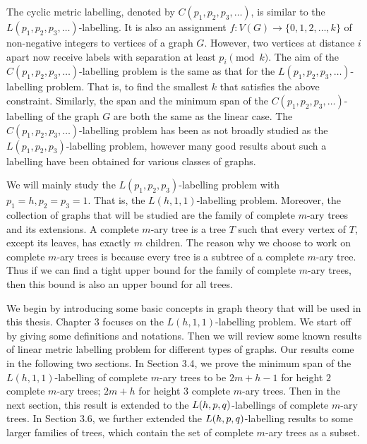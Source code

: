 The cyclic metric labelling, denoted by $C(p_1, p_2, p_3, \dots)$, is similar to the $L(p_1, p_2, p_3, \dots)$-labelling. It is also an assignment $f: V(G) \rightarrow \{0, 1, 2, \dots, k\}$ of non-negative integers to vertices of a graph $G$. However, two vertices at distance $i$ apart now receive labels with separation at least $p_i \pmod{k}$. The aim of the $C(p_1, p_2, p_3, \dots)$-labelling problem is the same as that for the $L(p_1, p_2, p_3, \dots)$-labelling problem. That is, to find the smallest $k$ that satisfies the above constraint. Similarly, the span and the minimum span of the $C(p_1, p_2, p_3, \dots)$-labelling of the graph $G$ are both the same as the linear case. The $C(p_1, p_2, p_3, \dots)$-labelling problem has been as not broadly studied as the $L(p_1, p_2, p_3)$-labelling problem, however many good results about such a labelling have been obtained for various classes of graphs.  

We will mainly study the $L(p_1, p_2, p_3)$-labelling problem with $p_1 = h, p_2=p_3=1$. That is, the $L(h,1,1)$-labelling problem. Moreover, the collection of graphs that will be studied are the family of complete $m$-ary trees and its extensions. A complete $m$-ary tree is a tree $T$ such that every vertex of $T$, except its leaves, has exactly $m$ children. The reason why we choose to work on complete $m$-ary trees is because every tree is a subtree of a complete $m$-ary tree. Thus if we can find a tight upper bound for the family of complete $m$-ary trees, then this bound is also an upper bound for all trees. 

We begin by introducing some basic concepts in graph theory that will be used in this thesis. Chapter 3 focuses on the $L(h,1,1)$-labelling problem. We start off by giving some definitions and notations. Then we will review some known results of linear metric labelling problem for different types of graphs. Our results come in the following two sections. In Section 3.4, we prove the minimum span of the $L(h,1,1)$-labelling of complete $m$-ary trees to be $2m+h-1$ for height $2$ complete $m$-ary trees; $2m+h$ for height $3$ complete $m$-ary trees. Then in the next section, this result is extended to the $L(h,p,q)$-labellings of complete $m$-ary trees. In Section 3.6, we further extended the $L(h,p,q)$-labelling results to some larger families of trees, which contain the set of complete $m$-ary trees as a subset. 

